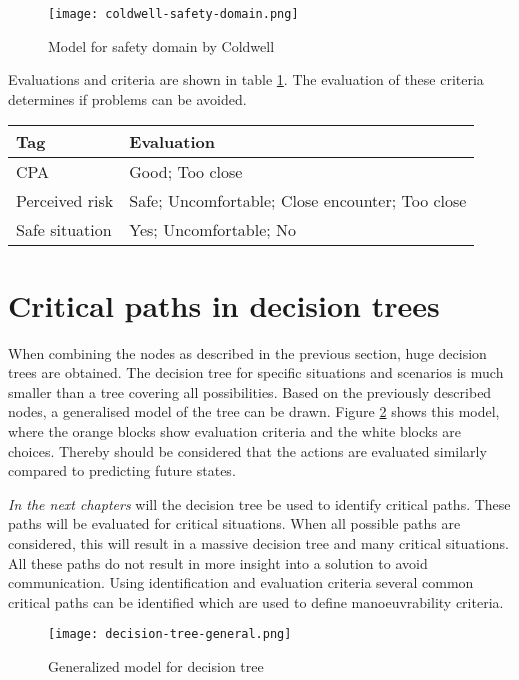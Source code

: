 \begin{figure}[p]
	\centering
	\texttt{[image: coldwell-safety-domain.png]}
	\caption{Model for safety domain by Coldwell}
	\label{fig:coldwell-safety-domain}
\end{figure}

Evaluations and criteria are shown in table \ref{tab:criteria-safe-situation}. The evaluation of these criteria determines if problems can be avoided.

\begin{table}[H]
	\begin{tabular}{p{}|p{}}
		\toprule
		Tag & Evaluation\\
		\midrule
		CPA & Good; Too close\\
		Perceived risk & Safe; Uncomfortable; Close encounter; Too close\\
		Safe situation & Yes; Uncomfortable; No\\
		\bottomrule
	\end{tabular}
	
	\label{tab:criteria-safe-situation}
\end{table}


\section{Critical paths in decision trees}
When combining the nodes as described in the previous section, huge decision trees are obtained. The decision tree for specific situations and scenarios is much smaller than a tree covering all possibilities. Based on the previously described nodes, a generalised model of the tree can be drawn. Figure \ref{fig:decision-tree-general} shows this model, where the orange blocks show evaluation criteria and the white blocks are choices. Thereby should be considered that the actions are evaluated similarly compared to predicting future states.

\emph{In the next chapters} will the decision tree be used to identify critical paths. These paths will be evaluated for critical situations. When all possible paths are considered, this will result in a massive decision tree and many critical situations. All these paths do not result in more insight into a solution to avoid communication. Using identification and evaluation criteria several common critical paths can be identified which are used to define manoeuvrability criteria.

\begin{figure}[p]
	\centering
	\texttt{[image: decision-tree-general.png]}
	\caption{Generalized model for decision tree}
	\label{fig:decision-tree-general}
\end{figure}
